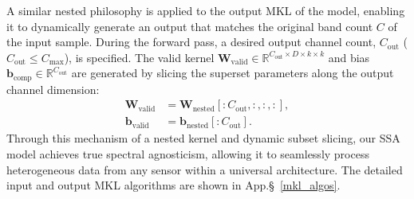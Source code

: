

A similar nested philosophy is applied to the output MKL of the model, enabling it to dynamically generate an output that matches the original band count $C$ of the input sample.
During the forward pass, a desired output channel count, $C_{\text{out}}$ ($C_{\text{out}} \le C_{\text{max}}$), is specified. The valid kernel $\mathbf{W}_{\text{valid}} \in \mathbb{R}^{C_{\text{out}} \times D \times k \times k}$ and bias $\mathbf{b}_{\text{comp}} \in \mathbb{R}^{C_{\text{out}}}$ are generated by slicing the superset parameters along the output channel dimension:
\begin{align}
    \mathbf{W}_{\text{valid}} &= \mathbf{W}_{\text{nested}}[:C_{\text{out}}, :, :, :], \\
    \mathbf{b}_{\text{valid}} &= \mathbf{b}_{\text{nested}}[:C_{\text{out}}].
    \label{eq:output_slice_w}
\end{align}
Through this mechanism of a nested kernel and dynamic subset slicing, our SSA model achieves true spectral agnosticism, allowing it to seamlessly process heterogeneous data from any sensor within a universal architecture. The detailed input and output MKL algorithms are shown in App.\S~\ref{mkl_algos}.

